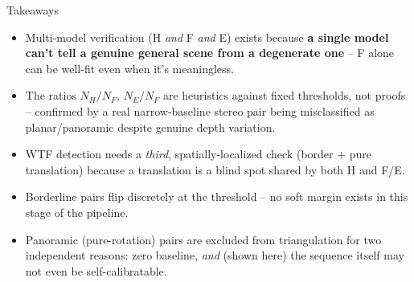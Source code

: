 \documentclass[11pt]{beamer}
\begin{document}
\begin{frame}{Takeaways}
  \begin{itemize}
    \item Multi-model verification (H \emph{and} F \emph{and} E) exists because
          \textbf{a single model can't tell a genuine general scene from a degenerate
          one} -- F alone can be well-fit even when it's meaningless.
    \item The ratios $N_H/N_F$, $N_E/N_F$ are heuristics against fixed thresholds, not
          proofs -- confirmed by a real narrow-baseline stereo pair being misclassified
          as planar/panoramic despite genuine depth variation.
    \item WTF detection needs a \emph{third}, spatially-localized check (border +
          pure translation) because a translation is a blind spot shared by both H and F/E.
    \item Borderline pairs flip discretely at the threshold -- no soft margin exists in
          this stage of the pipeline.
    \item Panoramic (pure-rotation) pairs are excluded from triangulation for two
          independent reasons: zero baseline, \emph{and} (shown here) the sequence itself
          may not even be self-calibratable.
  \end{itemize}
\end{frame}
\end{document}
